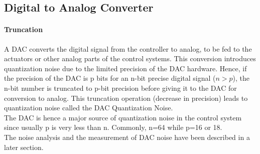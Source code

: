 \documentclass[a4paper,12pt]{article}
\begin{document}
    
    
	\subsection{Digital to Analog Converter}
    		\paragraph{Truncation}
    		A DAC converts the digital signal from the controller to analog, to be fed to the actuators or other analog parts of the control systems. This conversion introduces quantization noise due to the limited precision of the DAC hardware. Hence, if the precision of the DAC is p bits for an n-bit precise digital signal ($n>p$), the n-bit number is truncated to p-bit precision before giving it to the DAC for conversion to analog. This truncation operation (decrease in precision) leads to quantization noise called the DAC Quantization Noise. \\
    		The DAC is hence a major source of quantization noise in the control system since usually p is very less than n. Commonly, n=64 while p=16 or 18.\\
    		The noise analysis and the measurement of DAC noise have been described in a later section.
%     
%
%
\end{document}
